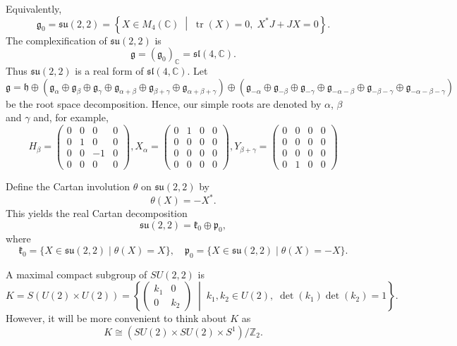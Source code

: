 \documentclass[twoside,a4paper,12pt]{article}
\newcommand{\g}{\ensuremath{\mathfrak g}}
\newcommand{\go}{\ensuremath{{\mathfrak g}_0}}
\newcommand{\h}{\ensuremath{\mathfrak h}}
\newcommand{\kko}{\ensuremath{{\mathfrak k}_0}}
\newcommand{\po}{\ensuremath{{\mathfrak p}_0}}
\newcommand{\su}{\ensuremath{{\mathfrak s}{\mathfrak u}}}
\newcommand{\C}{\ensuremath{\mathbb C}}
\newcommand{\Z}{\ensuremath{\mathbb Z}}
\theoremstyle{definition}
\begin{document}
Equivalently,
\[ \go=\su(2,2)=\left\{X \in M_4(\mathbb{C})\;\middle|\;
	\operatorname{tr}(X) = 0,\;X^* J + J X = 0\right\}. \]
The complexification of $\mathfrak{su}(2,2)$ is
\[ \g=(\g_0)_\C = \mathfrak{sl}(4,\C). \]
Thus $\mathfrak{su}(2,2)$ is a real form of $\mathfrak{sl}(4,\mathbb{C})$.
Let
\begin{equation*}
	\g=\h\oplus\left(\g_\alpha\oplus\g_\beta\oplus\g_\gamma\oplus
		\g_{\alpha+\beta}\oplus\g_{\beta+\gamma}\oplus
		\g_{\alpha+\beta+\gamma}\right)\oplus
		\left(\g_{-\alpha}\oplus\g_{-\beta}\oplus\g_{-\gamma}\oplus
		\g_{-\alpha-\beta}\oplus\g_{-\beta-\gamma}\oplus
		\g_{-\alpha-\beta-\gamma}\right)
\end{equation*}
be the root space decomposition. Hence, our simple roots are denoted by
$\alpha$, $\beta$ and $\gamma$ and, for example,
\begin{equation}\label{rootvec}
	H_\beta=\begin{pmatrix}0&0&0&0\\0&1&0&0\\0&0&-1&0\\0&0&0&0\end{pmatrix},
	X_\alpha=\begin{pmatrix}0&1&0&0\\0&0&0&0\\0&0&0&0\\0&0&0&0
		\end{pmatrix},
	Y_{\beta+\gamma}=\begin{pmatrix}0&0&0&0\\0&0&0&0\\0&0&0&0\\0&1&0&0
		\end{pmatrix}
\end{equation}

Define the Cartan involution $\theta$ on $\su(2,2)$ by
\[ \theta(X) = -X^*. \]
This yields the real Cartan decomposition
\[ \su(2,2) = \kko \oplus \po, \]
where
\[ \kko=\{X\in\su(2,2)\mid\theta(X)=X\},\quad
	\po=\{X\in\su(2,2)\mid\theta(X)=-X\}. \]

A maximal compact subgroup of $SU(2,2)$ is
\[ K = S(U(2) \times U(2)) = \left\{
	\begin{pmatrix}
		k_1 & 0 \\
		0 & k_2
	\end{pmatrix}\;\middle|\;k_1, k_2 \in U(2),\;\det(k_1)\det(k_2)=1\right\}.\]
However, it will be more convenient to think about $K$ as
\begin{equation}\label{K}
	K\cong(SU(2)\times SU(2)\times S^1)/\Z_2.
\end{equation}
\end{document}
